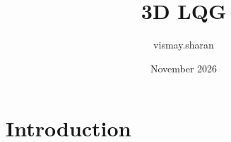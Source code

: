 \documentclass{article}
\title{3D LQG}
\author{vismay.sharan }
\date{November 2026}
\begin{document}
\maketitle

\section{Introduction}
\end{document}
